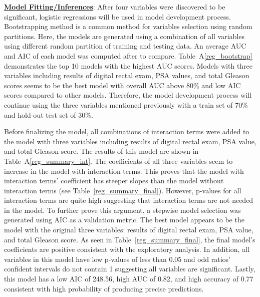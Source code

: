 \documentclass[11pt]{article}\usepackage[]{graphicx}\usepackage[]{color}
\begin{document}
\noindent\textbf{\underline{Model Fitting/Inferences}}: After four variables were discovered to be significant, logistic regressions will be used in model development process. Bootstrapping method is a common method for variables selection using random partitions. Here, the models are generated using a combination of all variables using different random partition of training and testing data. An average AUC and AIC of each model was computed after to compare. Table~A\ref{reg_bootstrap} demonstrates the top 10 models with the highest AUC scores. Models with three variables including results of digital rectal exam, PSA values, and total Gleason scores seems to be the best model with overall AUC above 80\% and low AIC scores compared to other models. Therefore, the model development process will continue using the three variables mentioned previously with a train set of 70\% and hold-out test set of 30\%.
\hfill \break

\noindent Before finalizing the model, all combinations of interaction terms were added to the model with three variables including results of digital rectal exam, PSA value, and total Gleason score. The results of this model are shown in Table~A\ref{reg_summary_int}. The coefficients of all three variables seem to increase in the model with interaction terms. This proves that the model with interaction terms’ coefficient has steeper slopes than the model without interaction terms (see Table~\ref{reg_summary_final}). However, p-values for all interaction terms are quite high suggesting that interaction terms are not needed in the model. To further prove this argument, a stepwise model selection was generated using AIC as a validation metric. The best model appears to be the model with the original three variables: results of digital rectal exam, PSA value, and total Gleason score. As seen in Table~\ref{reg_summary_final}, the final model's coefficients are positive consistent with the exploratory analysis. In addition, all variables in this model have low p-values of less than 0.05 and odd ratios’ confident intervals do not contain 1 suggesting all variables are significant. Lastly, this model has a low AIC of 248.56, high AUC of 0.82, and high accuracy of 0.77 consistent with high probability of producing precise predictions.
\noindent 
\end{document}
